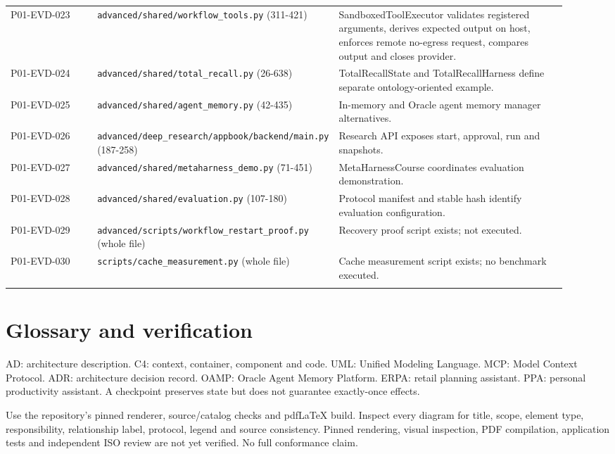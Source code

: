 \documentclass[10pt,letterpaper]{article}
\begin{document}
\begin{longtable}{@{}>{\raggedright\arraybackslash}p{0.16\linewidth}>{\raggedright\arraybackslash}p{0.34\linewidth}>{\raggedright\arraybackslash}p{0.42\linewidth}@{}}
P01-EVD-023 & \nolinkurl{advanced/shared/workflow_tools.py} (311-421) & SandboxedToolExecutor validates registered arguments, derives expected output on host, enforces remote no-egress request, compares output and closes provider.\\\addlinespace
P01-EVD-024 & \nolinkurl{advanced/shared/total_recall.py} (26-638) & TotalRecallState and TotalRecallHarness define separate ontology-oriented example.\\\addlinespace
P01-EVD-025 & \nolinkurl{advanced/shared/agent_memory.py} (42-435) & In-memory and Oracle agent memory manager alternatives.\\\addlinespace
P01-EVD-026 & \nolinkurl{advanced/deep_research/appbook/backend/main.py} (187-258) & Research API exposes start, approval, run and snapshots.\\\addlinespace
P01-EVD-027 & \nolinkurl{advanced/shared/metaharness_demo.py} (71-451) & MetaHarnessCourse coordinates evaluation demonstration.\\\addlinespace
P01-EVD-028 & \nolinkurl{advanced/shared/evaluation.py} (107-180) & Protocol manifest and stable hash identify evaluation configuration.\\\addlinespace
P01-EVD-029 & \nolinkurl{advanced/scripts/workflow_restart_proof.py} (whole file) & Recovery proof script exists; not executed.\\\addlinespace
P01-EVD-030 & \nolinkurl{scripts/cache_measurement.py} (whole file) & Cache measurement script exists; no benchmark executed.\\\addlinespace
\bottomrule\end{longtable}

\section{Glossary and verification}
AD: architecture description. C4: context, container, component and code. UML: Unified Modeling Language. MCP: Model Context Protocol. ADR: architecture decision record. OAMP: Oracle Agent Memory Platform. ERPA: retail planning assistant. PPA: personal productivity assistant. A checkpoint preserves state but does not guarantee exactly-once effects.
\par
Use the repository's pinned renderer, source/catalog checks and pdfLaTeX build. Inspect every diagram for title, scope, element type, responsibility, relationship label, protocol, legend and source consistency. Pinned rendering, visual inspection, PDF compilation, application tests and independent ISO review are not yet verified. No full conformance claim.
\end{document}
